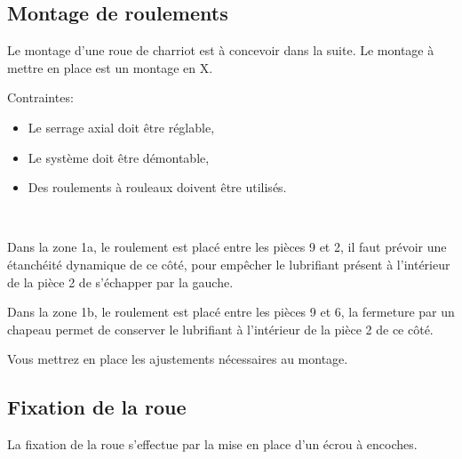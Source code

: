 

\subsection{Montage de roulements}
 
Le montage d'une roue de charriot est à concevoir dans la suite. Le montage à mettre en place est un montage en X.

Contraintes:\\
\begin{itemize}
 \item Le serrage axial doit être réglable,
 \item Le système doit être démontable,
 \item Des roulements à rouleaux doivent être utilisés.
\end{itemize}


~\

Dans la zone 1a, le roulement est placé entre les pièces 9 et 2, il faut prévoir une étanchéité dynamique de ce côté, pour empêcher le lubrifiant présent à l'intérieur de la pièce 2 de s'échapper par la gauche.

Dans la zone 1b, le roulement est placé entre les pièces 9 et 6, la fermeture par un chapeau permet de conserver le lubrifiant à l'intérieur de la pièce 2 de ce côté.

Vous mettrez en place les ajustements nécessaires au montage.

\subsection{Fixation de la roue}

La fixation de la roue s'effectue par la mise en place d'un écrou à encoches.


\finsujet

